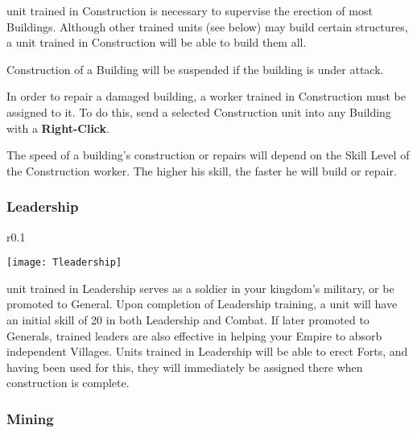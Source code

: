 
 unit trained in Construction is necessary to supervise the erection of most Buildings. Although other trained units (see below) may build certain structures, a unit trained in Construction will be able to build them all.

Construction of a Building will be suspended if the building is under attack.

In order to repair a damaged building, a worker trained in Construction must be assigned to it. To do this, send a selected Construction unit into any Building with a \textbf{Right-Click}.

The speed of a building’s construction or repairs will depend on the Skill Level of the Construction worker. The higher his skill, the faster he will build or repair.

\subsubsection{\textsf{Leadership}}


\begin{wrapfigure}{r}{0.1\textwidth}
    \vspace{-20pt}
    \begin{center}
        \texttt{[image: Tleadership]}
    \end{center}
    \vspace{-20pt}
\end{wrapfigure}


 unit trained in Leadership serves as a soldier in your kingdom’s military, or be promoted to General. Upon completion of Leadership training, a unit will have an initial skill of 20 in both Leadership and Combat. If later promoted to Generals, trained leaders are also effective in helping your Empire to absorb independent Villages. Units trained in Leadership will be able to erect Forts, and having been used for this, they will immediately be assigned there when construction is complete.

\subsubsection{\textsf{Mining}}


